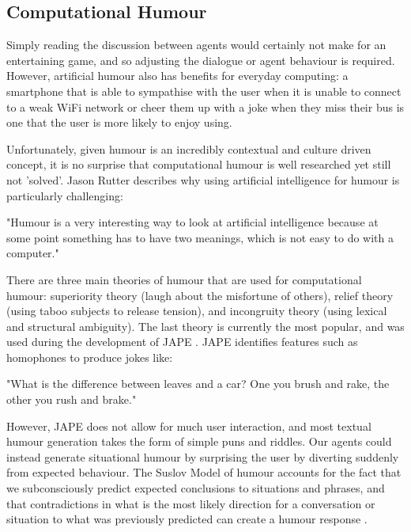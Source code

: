 \documentclass[conference]{IEEEtran}
\begin{document}
\subsection{Computational Humour}

Simply reading the discussion between agents would certainly not make for an entertaining game, and so adjusting the dialogue or agent behaviour is required. However, artificial humour also has benefits for everyday computing: a smartphone that is able to sympathise with the user when it is unable to connect to a weak WiFi network or cheer them up with a joke when they miss their bus is one that the user is more likely to enjoy using. 

Unfortunately, given humour is an incredibly contextual and culture driven concept, it is no surprise that computational humour is well researched yet still not 'solved'. Jason Rutter describes why using artificial intelligence for humour is particularly challenging:

\begin{displayquote}
"Humour is a very interesting way to look at artificial intelligence because at some point something has to have two meanings, which is not easy to do with a computer." \cite{jasonrutter}
\end{displayquote}

There are three main theories of humour that are used for computational humour: superiority theory (laugh about the misfortune of others), relief theory (using taboo subjects to release tension), and incongruity theory (using lexical and structural ambiguity). The last theory is currently the most popular, and was used during the development of JAPE \cite{jape}. JAPE identifies features such as homophones to produce jokes like:

\begin{displayquote}
	"What is the difference between leaves and a car? One you brush and rake, the other you rush and brake."
\end{displayquote}

However, JAPE does not allow for much user interaction, and most textual humour generation takes the form of simple puns and riddles. Our agents could instead generate situational humour by surprising the user by diverting suddenly from expected behaviour. The Suslov Model of humour accounts for the fact that we subconsciously predict expected conclusions to situations and phrases, and that contradictions in what is the most likely direction for a conversation or situation to what was previously predicted can create a humour response \cite{suslov}.
\end{document}
